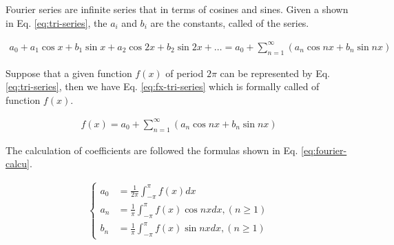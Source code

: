 Fourier series are infinite series that  in terms of cosines and sines.
Given a  shown in Eq. \ref{eq:tri-series}, the $a_i$ and $b_i$ are the constants, called  of the series.

\begin{align}
  a_0 + a_1 \cos x + b_1 \sin x + a_2 \cos 2x + b_2 \sin 2x + \dots = a_0 + \sum^\infty_{n=1}(a_n \cos nx + b_n \sin nx)
  \label{eq:tri-series}
\end{align}

Suppose that a given function $f(x)$ of period $2\pi$ can be represented by Eq. \ref{eq:tri-series}, then we have Eq. \ref{eq:fx-tri-series} which is formally called  of function $f(x)$.

\begin{align}
  f(x) = a_0 + \sum^\infty_{n=1}(a_n \cos nx + b_n \sin nx)
  \label{eq:fx-tri-series}
\end{align}

The calculation of coefficients are followed the formulas shown in Eq. \ref{eq:fourier-calcu}.

\begin{align}
  \begin{cases}
    a_0 &= \frac{1}{2\pi}\int_{-\pi}^{\pi} f(x) dx \\
    a_n &= \frac{1}{\pi}\int_{-\pi}^{\pi} f(x)\cos nx dx, (n \geq 1) \\
    b_n &= \frac{1}{\pi}\int_{-\pi}^{\pi} f(x)\sin nx dx, (n \geq 1)
  \end{cases}
  \label{eq:fourier-calcu}
\end{align}